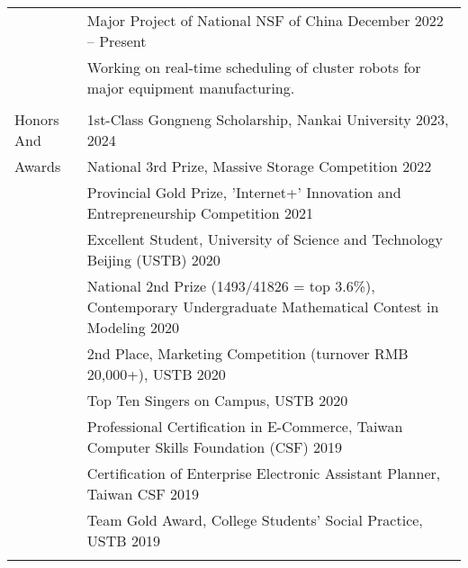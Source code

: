 \documentclass[letterpaper, 10pt]{article}
\begin{document}
\begin{longtable}{p{}p{}}
& {Major Project of National NSF of China} \hfill December 2022 -- Present \\
& Working on real-time scheduling of cluster robots for major equipment manufacturing. \\
& \\



%
%



\nohyphens{\textcolor{OliveGreen}{Honors And}}
& 1st-Class Gongneng Scholarship, Nankai University \hfill 2023, 2024 \\
\nohyphens{\textcolor{OliveGreen}{Awards}}
& National 3rd Prize, Massive Storage Competition \hfill 2022 \\
& Provincial Gold Prize, 'Internet+' Innovation and Entrepreneurship Competition \hfill 2021 \\
& Excellent Student, University of Science and Technology Beijing (USTB) \hfill 2020 \\
& National 2nd Prize (1493/41826 = top 3.6\%), Contemporary Undergraduate Mathematical Contest in Modeling \hfill 2020 \\
& 2nd Place, Marketing Competition (turnover RMB 20,000+), USTB \hfill 2020 \\
& Top Ten Singers on Campus, USTB \hfill 2020 \\
& Professional Certification in E-Commerce, Taiwan Computer Skills Foundation (CSF) \hfill 2019 \\
& Certification of Enterprise Electronic Assistant Planner, Taiwan CSF \hfill 2019 \\	
& Team Gold Award, College Students' Social Practice, USTB \hfill 2019 \\
& \\
 


\end{longtable}
\end{document}

